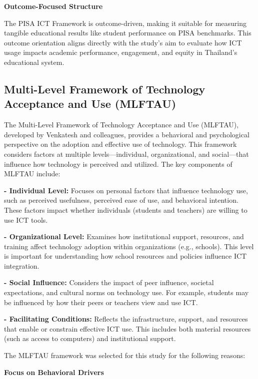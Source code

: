 \documentclass[
]{article}
\begin{document}
\textbf{Outcome-Focused Structure}

The PISA ICT Framework is outcome-driven, making it suitable for
measuring tangible educational results like student performance on PISA
benchmarks. This outcome orientation aligns directly with the study's
aim to evaluate how ICT usage impacts academic performance, engagement,
and equity in Thailand's educational system.

\hypertarget{multi-level-framework-of-technology-acceptance-and-use-mlftau}{%
\subsection{Multi-Level Framework of Technology Acceptance and Use
(MLFTAU)}\label{multi-level-framework-of-technology-acceptance-and-use-mlftau}}

The Multi-Level Framework of Technology Acceptance and Use (MLFTAU),
developed by Venkatesh and colleagues, provides a behavioral and
psychological perspective on the adoption and effective use of
technology. This framework considers factors at multiple
levels---individual, organizational, and social---that influence how
technology is perceived and utilized. The key components of MLFTAU
include:

\textbf{- Individual Level:} Focuses on personal factors that influence
technology use, such as perceived usefulness, perceived ease of use, and
behavioral intention. These factors impact whether individuals (students
and teachers) are willing to use ICT tools.

\textbf{- Organizational Level:} Examines how institutional support,
resources, and training affect technology adoption within organizations
(e.g., schools). This level is important for understanding how school
resources and policies influence ICT integration.

\textbf{- Social Influence:} Considers the impact of peer influence,
societal expectations, and cultural norms on technology use. For
example, students may be influenced by how their peers or teachers view
and use ICT.

\textbf{- Facilitating Conditions:} Reflects the infrastructure,
support, and resources that enable or constrain effective ICT use. This
includes both material resources (such as access to computers) and
institutional support.

The MLFTAU framework was selected for this study for the following
reasons:

\textbf{Focus on Behavioral Drivers}
\end{document}
